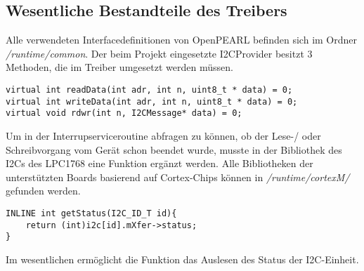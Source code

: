 \subsection{Wesentliche Bestandteile des Treibers}
Alle verwendeten Interfacedefinitionen von OpenPEARL befinden sich im Ordner {\textit{/runtime/common}}.
Der beim Projekt eingesetzte I2CProvider besitzt 3 Methoden, die im Treiber umgesetzt werden müssen.
\begin{lstlisting}
virtual int readData(int adr, int n, uint8_t * data) = 0;
virtual int writeData(int adr, int n, uint8_t * data) = 0;
virtual void rdwr(int n, I2CMessage* data) = 0;
\end{lstlisting}
Um in der Interrupserviceroutine abfragen zu können, ob der Lese-/ oder Schreibvorgang vom Gerät schon beendet wurde, musste in der Bibliothek des I2Cs des LPC1768 eine Funktion ergänzt werden. Alle Bibliotheken der unterstützten Boards basierend auf Cortex-Chips können in {\textit{/runtime/cortexM/}} gefunden werden.
\begin{lstlisting}
INLINE int getStatus(I2C_ID_T id){
	return (int)i2c[id].mXfer->status;
}
\end{lstlisting}
Im wesentlichen ermöglicht die Funktion das Auslesen des Status der I2C-Einheit. 

